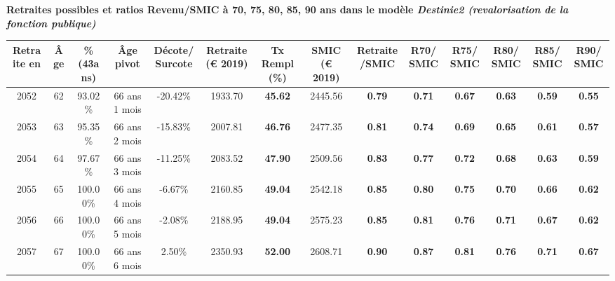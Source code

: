  \vspace{0.1cm} 
{\bf \noindent Retraites possibles et ratios Revenu/SMIC à 70, 75, 80, 85, 90 ans dans le modèle \emph{Destinie2 (revalorisation de la fonction publique)}}  
 
\begin{adjustbox}{max width=\textwidth} 
\begin{tabular}[htb]{|c|c||c|c|c||c|c||c|c||c|c|c|c|c|} 
\hline 
 Retraite en &  Âge &  \%(43ans) &  Âge pivot &  Décote/Surcote &  Retraite (\euro{} 2019) &  Tx Rempl(\%) &  SMIC (\euro{} 2019) &  Retraite/SMIC &  R70/SMIC &  R75/SMIC &  R80/SMIC &  R85/SMIC &  R90/SMIC \\ 
\hline \hline 
 2052 &  62 &  93.02\% &  66 ans 1 mois &  -20.42\% &  1933.70 &  {\bf 45.62} &  2445.56 &  {\bf {\color{red} 0.79}} &  {\bf {\color{red} 0.71}} &  {\bf {\color{red} 0.67}} &  {\bf {\color{red} 0.63}} &  {\bf {\color{red} 0.59}} &  {\bf {\color{red} 0.55}} \\ 
\hline 
 2053 &  63 &  95.35\% &  66 ans 2 mois &  -15.83\% &  2007.81 &  {\bf 46.76} &  2477.35 &  {\bf {\color{red} 0.81}} &  {\bf {\color{red} 0.74}} &  {\bf {\color{red} 0.69}} &  {\bf {\color{red} 0.65}} &  {\bf {\color{red} 0.61}} &  {\bf {\color{red} 0.57}} \\ 
\hline 
 2054 &  64 &  97.67\% &  66 ans 3 mois &  -11.25\% &  2083.52 &  {\bf 47.90} &  2509.56 &  {\bf {\color{red} 0.83}} &  {\bf {\color{red} 0.77}} &  {\bf {\color{red} 0.72}} &  {\bf {\color{red} 0.68}} &  {\bf {\color{red} 0.63}} &  {\bf {\color{red} 0.59}} \\ 
\hline 
 2055 &  65 &  100.00\% &  66 ans 4 mois &  -6.67\% &  2160.85 &  {\bf 49.04} &  2542.18 &  {\bf {\color{red} 0.85}} &  {\bf {\color{red} 0.80}} &  {\bf {\color{red} 0.75}} &  {\bf {\color{red} 0.70}} &  {\bf {\color{red} 0.66}} &  {\bf {\color{red} 0.62}} \\ 
\hline 
 2056 &  66 &  100.00\% &  66 ans 5 mois &  -2.08\% &  2188.95 &  {\bf 49.04} &  2575.23 &  {\bf {\color{red} 0.85}} &  {\bf {\color{red} 0.81}} &  {\bf {\color{red} 0.76}} &  {\bf {\color{red} 0.71}} &  {\bf {\color{red} 0.67}} &  {\bf {\color{red} 0.62}} \\ 
\hline 
 2057 &  67 &  100.00\% &  66 ans 6 mois &  2.50\% &  2350.93 &  {\bf 52.00} &  2608.71 &  {\bf {\color{red} 0.90}} &  {\bf {\color{red} 0.87}} &  {\bf {\color{red} 0.81}} &  {\bf {\color{red} 0.76}} &  {\bf {\color{red} 0.71}} &  {\bf {\color{red} 0.67}} \\ 
\hline 
\hline 
\end{tabular} 
\end{adjustbox} 
 
